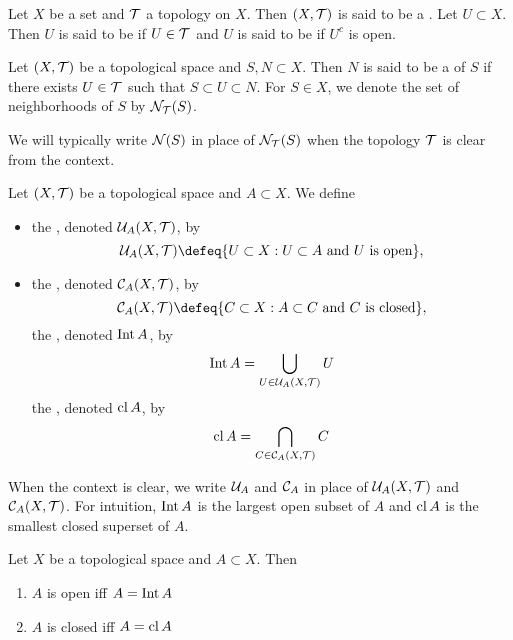 \documentclass{book}
\begin{document}
	\begin{defn} 
	Let $X$ be a set and $\mathcal{T}$ a topology on $X$. Then $(X, \mathcal{T})$ is said to be a . Let $U \subset X$. Then $U$ is said to be  if $U \in \mathcal{T}$ and $U$ is said to be  if $U^c$ is open.
	\end{defn}
	
	\begin{defn} 
	Let $(X, \mathcal{T})$ be a topological space and $S,N \subset X$. Then $N$ is said to be a  of $S$ if there exists $U \in \mathcal{T}$ such that $S \subset U \subset N$. For $S \in X$, we denote the set of neighborhoods of $S$ by $\mathcal{N}_{\mathcal{T}}(S)$.
	\end{defn}

	\begin{note}
		We will typically write $\mathcal{N}(S)$ in place of $\mathcal{N}_{\mathcal{T}}(S)$ when the topology $\mathcal{T}$ is clear from the context.
	\end{note}
	
	\begin{defn} 
	Let $(X, \mathcal{T})$ be a topological space and $A \subset X$. We define
	\begin{itemize}
		\item the , denoted $\mathcal{U}_A(X, \mathcal{T})$, by 
		$$\MU_{A}(X, \MT) \defeq \{U \subset X:U \subset A \text{ and $U$ is open}\},$$ 
		\item the , denoted $\mathcal{C}_A(X, \mathcal{T})$, by 
		$$\MC_{A}(X, \MT) \defeq \{C \subset X: A \subset C \text{ and $C$ is closed}\},$$ 
		the , denoted $\operatorname{Int} A$, by 
		$$\operatorname{Int} A = \bigcup_{U \in \mathcal{U}_{A}(X, \mathcal{T})} U$$ 
		the , denoted $\operatorname{cl} A$, by 
		$$\operatorname{cl} A = \bigcap_{C \in \mathcal{C}_{A}(X, \mathcal{T})} C$$ 
	\end{itemize}
	\end{defn}

	\begin{note}
		When the context is clear, we write $\mathcal{U}_A$ and $\mathcal{C}_A$ in place of $\mathcal{U}_A(X, \mathcal{T})$ and $\mathcal{C}_A(X, \mathcal{T})$. For intuition, $\operatorname{Int} A$ is the largest open subset of $A$ and $\operatorname{cl} A$ is the smallest closed superset of $A$. 
	\end{note}
	
	\begin{defn} 
	Let $X$ be a topological space and $A \subset X$. Then 
	\begin{enumerate}
	\item $A$ is open iff $A = \operatorname{Int} A$ 
	\item $A$ is closed iff $A = \operatorname{cl} A$
	\end{enumerate}
	\end{defn}
	
\end{document}

